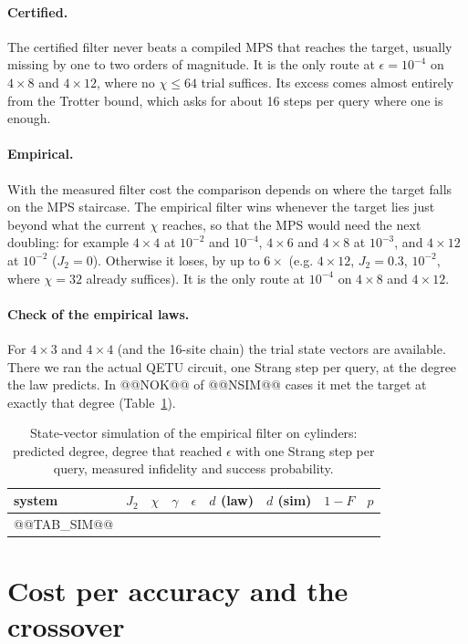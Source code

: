 \documentclass[10pt]{article}
\begin{document}
\paragraph{Certified.} The certified filter never beats a compiled MPS that reaches the target, usually missing by
one to two orders of magnitude. It is the only route at $\epsilon=10^{-4}$ on $4\times8$ and $4\times12$, where no
$\chi\le64$ trial suffices. Its excess comes almost entirely from the Trotter bound, which asks for about
16 steps per query where one is enough.

\paragraph{Empirical.} With the measured filter cost the comparison depends on where the target falls on the
MPS staircase. The empirical filter wins whenever the target lies just beyond what the current $\chi$ reaches, so that
the MPS would need the next doubling: for example $4\times4$ at $10^{-2}$ and $10^{-4}$, $4\times6$ and $4\times8$ at
$10^{-3}$, and $4\times12$ at $10^{-2}$ ($J_2=0$). Otherwise it loses, by up to $6\times$ (e.g. $4\times12$, $J_2=0.3$,
$10^{-2}$, where $\chi=32$ already suffices). It is the only route at $10^{-4}$ on $4\times8$ and $4\times12$.

\paragraph{Check of the empirical laws.} For $4\times3$ and $4\times4$ (and the 16-site chain) the trial
state vectors are available. There we ran the actual QETU circuit, one Strang step per query, at the degree
the law predicts. In @@NOK@@ of @@NSIM@@ cases it met the target at exactly that degree
(Table~\ref{tab:sim}).

\begin{table}[h]
\centering\small
\caption{State-vector simulation of the empirical filter on cylinders: predicted degree, degree that
reached $\epsilon$ with one Strang step per query, measured infidelity and success probability.}
\label{tab:sim}
\begin{tabular}{lrrrcrrcc}
\toprule
system & $J_2$ & $\chi$ & $\gamma$ & $\epsilon$ & $d$ (law) & $d$ (sim) & $1-F$ & $p$ \\
\midrule
@@TAB_SIM@@
\bottomrule
\end{tabular}
\end{table}

\section{Cost per accuracy and the crossover}
\end{document}
